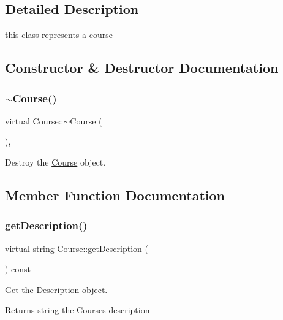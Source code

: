 \subsection{Detailed Description}
this class represents a course 

\subsection{Constructor \& Destructor Documentation}
\mbox{\label{classCourse_a80fed7c3f708fc4800517140cfbbb024}} 
\subsubsection{\texorpdfstring{$\sim$\+Course()}{~Course()}}
{\footnotesize\ttfamily virtual Course\+::$\sim$\+Course (\begin{DoxyParamCaption}{ }\end{DoxyParamCaption})\hspace{0.3cm}{\ttfamily [inline]}, {\ttfamily [virtual]}}



Destroy the \hyperlink{classCourse}{Course} object. 



\subsection{Member Function Documentation}
\mbox{\label{classCourse_a19bced7786d959ca6110afc6d00bc751}} 
\subsubsection{\texorpdfstring{get\+Description()}{getDescription()}}
{\footnotesize\ttfamily virtual string Course\+::get\+Description (\begin{DoxyParamCaption}{ }\end{DoxyParamCaption}) const\hspace{0.3cm}{\ttfamily [pure virtual]}}



Get the Description object. 

\begin{DoxyReturn}{Returns}
string the \hyperlink{classCourse}{Course}\textquotesingle{}s description 
\end{DoxyReturn}


